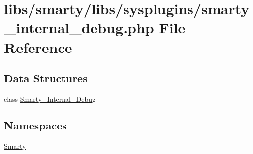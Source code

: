 \hypertarget{smarty__internal__debug_8php}{}\section{libs/smarty/libs/sysplugins/smarty\+\_\+internal\+\_\+debug.php File Reference}
\label{smarty__internal__debug_8php}
\subsection*{Data Structures}
\begin{DoxyCompactItemize}
\item 
class \hyperlink{class_smarty___internal___debug}{Smarty\+\_\+\+Internal\+\_\+\+Debug}
\end{DoxyCompactItemize}
\subsection*{Namespaces}
\begin{DoxyCompactItemize}
\item 
 \hyperlink{namespace_smarty}{Smarty}
\end{DoxyCompactItemize}
